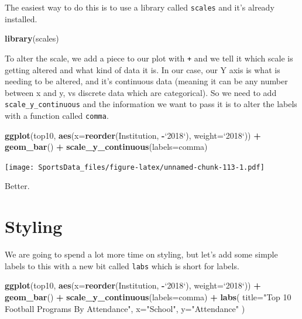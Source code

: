 \documentclass[
]{book}
\newenvironment{Shaded}{\begin{snugshade}}{\end{snugshade}}
\newcommand{\DataTypeTok}[1]{\textcolor[rgb]{0.13,0.29,0.53}{#1}}
\newcommand{\KeywordTok}[1]{\textcolor[rgb]{0.13,0.29,0.53}{\textbf{#1}}}
\newcommand{\NormalTok}[1]{#1}
\newcommand{\OperatorTok}[1]{\textcolor[rgb]{0.81,0.36,0.00}{\textbf{#1}}}
\newcommand{\StringTok}[1]{\textcolor[rgb]{0.31,0.60,0.02}{#1}}
\begin{document}
The easiest way to do this is to use a library called \texttt{scales} and it's already installed.

\begin{Shaded}
\begin{Highlighting}[]
\KeywordTok{library}\NormalTok{(scales)}
\end{Highlighting}
\end{Shaded}

To alter the scale, we add a piece to our plot with \texttt{+} and we tell it which scale is getting altered and what kind of data it is. In our case, our Y axis is what is needing to be altered, and it's continuous data (meaning it can be any number between x and y, vs discrete data which are categorical). So we need to add \texttt{scale\_y\_continuous} and the information we want to pass it is to alter the labels with a function called \texttt{comma}.

\begin{Shaded}
\begin{Highlighting}[]
\KeywordTok{ggplot}\NormalTok{(top10, }\KeywordTok{aes}\NormalTok{(}\DataTypeTok{x=}\KeywordTok{reorder}\NormalTok{(Institution, }\OperatorTok{-}\StringTok{`}\DataTypeTok{2018}\StringTok{`}\NormalTok{), }\DataTypeTok{weight=}\StringTok{`}\DataTypeTok{2018}\StringTok{`}\NormalTok{)) }\OperatorTok{+}\StringTok{ }
\StringTok{  }\KeywordTok{geom_bar}\NormalTok{() }\OperatorTok{+}\StringTok{ }
\StringTok{  }\KeywordTok{scale_y_continuous}\NormalTok{(}\DataTypeTok{labels=}\NormalTok{comma)}
\end{Highlighting}
\end{Shaded}

\texttt{[image: SportsData\_files/figure-latex/unnamed-chunk-113-1.pdf]}

Better.

\hypertarget{styling}{%
\section{Styling}\label{styling}}

We are going to spend a lot more time on styling, but let's add some simple labels to this with a new bit called \texttt{labs} which is short for labels.

\begin{Shaded}
\begin{Highlighting}[]
\KeywordTok{ggplot}\NormalTok{(top10, }\KeywordTok{aes}\NormalTok{(}\DataTypeTok{x=}\KeywordTok{reorder}\NormalTok{(Institution, }\OperatorTok{-}\StringTok{`}\DataTypeTok{2018}\StringTok{`}\NormalTok{), }\DataTypeTok{weight=}\StringTok{`}\DataTypeTok{2018}\StringTok{`}\NormalTok{)) }\OperatorTok{+}\StringTok{ }
\StringTok{  }\KeywordTok{geom_bar}\NormalTok{() }\OperatorTok{+}\StringTok{ }
\StringTok{  }\KeywordTok{scale_y_continuous}\NormalTok{(}\DataTypeTok{labels=}\NormalTok{comma) }\OperatorTok{+}\StringTok{ }
\StringTok{  }\KeywordTok{labs}\NormalTok{(}
    \DataTypeTok{title=}\StringTok{"Top 10 Football Programs By Attendance"}\NormalTok{, }
    \DataTypeTok{x=}\StringTok{"School"}\NormalTok{, }
    \DataTypeTok{y=}\StringTok{"Attendance"}
\NormalTok{)}
\end{Highlighting}
\end{Shaded}
\end{document}
